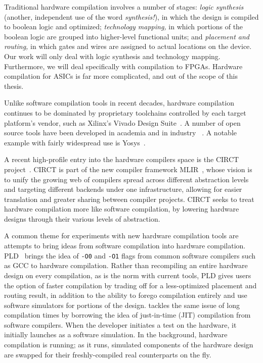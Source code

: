 Traditional hardware compilation
  involves a number of stages:
  \textit{logic synthesis}
  (another, independent use
    of the word \textit{synthesis!}),
  in which the design is
  compiled to boolean logic
  and optimized;
  \textit{technology mapping,}
  in which portions of the
  boolean logic
  are grouped into higher-level
  functional units;
  and
  \textit{placement and routing,}
  in which gates and wires
  are assigned to actual locations
  on the device.
Our work will only deal with
  logic synthesis
  and technology mapping.
Furthermore,
  we will deal specifically with
  compilation to FPGAs.
Hardware compilation for ASICs
  is far more complicated,
  and out of the scope of this thesis.

Unlike software compilation
  tools
  in recent decades,
  hardware compilation
  continues to be dominated
  by proprietary toolchains
  controlled by each
  target platform's vendor,
  such as Xilinx's
  Vivado Design Suite~\cite{vivado}.
A number of open source tools
  have been developed
  in academia
  and in industry%
  ~\cite{rose2012vtr, lavin2018rapidwright}.
A notable example
  with fairly widespread use
  is Yosys~\cite{wolf2013yosys}.
  
A recent high-profile
  entry into the hardware compilers space
  is the CIRCT project~\cite{eldridge2021mlir,urbach2022hls}.
CIRCT is part of
  the new compiler framework
  MLIR~\cite{lattner2021mlir},
  whose vision
  is to unify the growing web
  of compilers
  spread across different abstraction
  levels
  and targeting different backends
  under one 
  infrastructure,
  allowing for easier translation
  and greater sharing
  between compiler projects.
CIRCT seeks to treat
  hardware compilation
  more like software compilation,
  by lowering hardware designs
  through their various levels of abstraction.
  
A common theme
  for experiments
  with new hardware compilation tools
  are attempts to bring
  ideas from software compilation
  into hardware compilation.
PLD~\cite{xiao2022pld}
  brings the idea of 
  \texttt{-O0}
  and
  \texttt{-O1}
  flags from common software
  compilers such as
  GCC to hardware compilation.
Rather than recompiling
  an entire hardware design
  on every compilation,
  as is the norm with current tools,
  PLD gives users the option
  of faster compilation
  by trading off for
  a
  less-optimized placement and routing result,
  in addition to the ability
  to forego compilation entirely
  and use software simulators
  for portions of the design.
\cite{schkufza2019cascade}
  tackles the same issue
  of long compilation times
  by borrowing the idea of
  just-in-time (JIT)
  compilation
  from software compilers.
When the developer
  initiates a test
  on the hardware,
  it initially launches
  as a software simulation.
In the background,
  hardware compilation is running;
  as it runs,
  simulated
  components of the hardware design
  are swapped for their
  freshly-compiled
  real counterparts
  on the fly.
  
